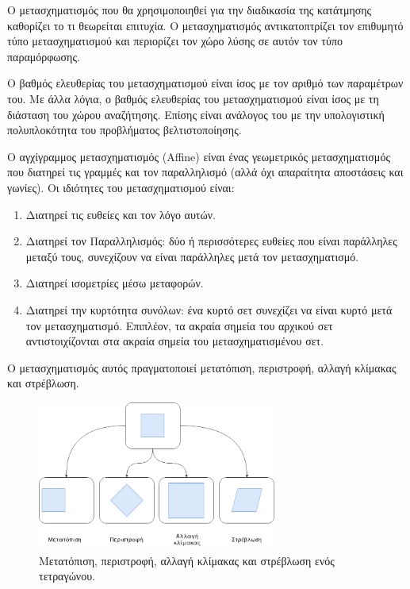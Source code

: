 \documentclass[a4paper,12pt]{article}
\begin{document}
Ο μετασχηματισμός που θα χρησιμοποιηθεί για την διαδικασία της κατάτμησης
καθορίζει το τι θεωρείται επιτυχία. Ο μετασχηματισμός αντικατοπτρίζει τον
επιθυμητό τύπο μετασχηματισμού και περιορίζει τον χώρο λύσης σε αυτόν τον τύπο
παραμόρφωσης.

Ο βαθμός ελευθερίας του μετασχηματισμού είναι ίσος με τον αριθμό των παραμέτρων
του. Με άλλα λόγια, ο βαθμός ελευθερίας του μετασχηματισμού είναι ίσος με τη
διάσταση του χώρου αναζήτησης. Επίσης είναι ανάλογος του με την υπολογιστική
πολυπλοκότητα του προβλήματος βελτιστοποίησης.

Ο αγχίγραμμος μετασχηματισμός (Affine) είναι ένας γεωμετρικός μετασχηματισμός
που διατηρεί τις γραμμές και τον παραλληλισμό (αλλά όχι απαραίτητα αποστάσεις
και γωνίες). Οι ιδιότητες του μετασχηματισμού είναι:

\begin{enumerate}
    \item Διατηρεί τις ευθείες και τον λόγο αυτών.
    \item Διατηρεί τον Παραλληλισμός: δύο ή περισσότερες ευθείες που είναι
        παράλληλες μεταξύ τους, συνεχίζουν να είναι παράλληλες μετά τον
        μετασχηματισμό.
    \item Διατηρεί ισομετρίες μέσω μεταφορών. 
    \item Διατηρεί την κυρτότητα συνόλων: ένα κυρτό σετ συνεχίζει να είναι κυρτό
        μετά τον μετασχηματισμό. Επιπλέον, τα ακραία σημεία του αρχικού σετ
        αντιστοιχίζονται στα ακραία σημεία του μετασχηματισμένου σετ.
\end{enumerate}

Ο μετασχηματισμός αυτός πραγματοποιεί μετατόπιση, περιστροφή, αλλαγή κλίμακας
και στρέβλωση.

\begin{figure}[h]
    \centering
    \includegraphics[width=0.7\textwidth]{affine}
    \captionsetup{width=0.7\textwidth}
    \caption{Μετατόπιση, περιστροφή, αλλαγή κλίμακας και στρέβλωση ενός
    τετραγώνου.}
\end{figure}
\end{document}
